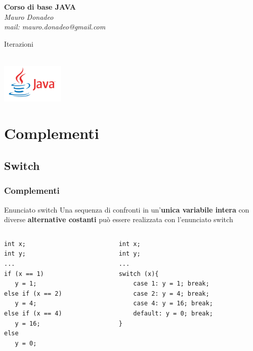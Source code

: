 \begin{frame}
	\begin{block}{}
		\begin{center}
			{\large\textbf{Corso di base JAVA}}\\
			\itshape{Mauro Donadeo}\\
			mail: mauro.donadeo@gmail.com
		\end{center}
	\end{block}
	\begin{block}{}	
		\begin{center}
			\begin{huge}
			Iterazioni
			\end{huge}\\
			\includegraphics[width = 30mm]{images/java-logo.jpg}
		\end{center}
	\end{block}	
\end{frame}

\section*{Complementi}
\subsection*{Switch}
\begin{frame}[fragile]
\frametitle{Complementi}
\begin{block}{Enunciato switch}
Una sequenza di confronti in un'\textbf{unica variabile intera} con diverse \textbf{alternative costanti} può essere realizzata con 
l'enunciato \alert{switch}
\end{block}
\begin{columns}
\begin{column}{0.4\textwidth}
\begin{lstlisting}
int x;
int y;
...
if (x == 1)
   y = 1;
else if (x == 2)
   y = 4;
else if (x == 4)
   y = 16;
else
   y = 0;
\end{lstlisting}
\end{column}
\begin{column}{0.55\textwidth}
\begin{lstlisting}
int x;
int y;
...
switch (x){ 
    case 1: y = 1; break;
    case 2: y = 4; break;
    case 4: y = 16; break;
    default: y = 0; break;
}
\end{lstlisting}
\end{column}
\end{columns}
\end{frame}

